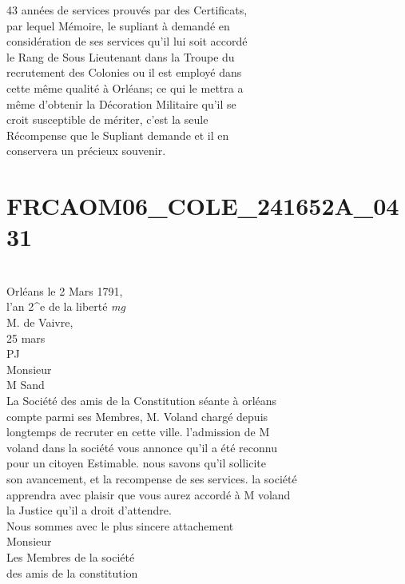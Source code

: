 \documentclass{article}
\begin{document}
\begin{pages}
43 années de services prouvés par des Certificats,\\
par lequel Mémoire, le supliant à demandé en\\
considération de ses services qu'il lui soit accordé\\
le Rang de Sous Lieutenant dans la Troupe du\\
recrutement des Colonies ou il est employé dans\\
cette même qualité à Orléans; ce qui le mettra a\\
même d'obtenir la Décoration Militaire qu'il se\\
croit susceptible de mériter, c'est la seule\\
Récompense que le Supliant demande et il en\\
conservera un précieux souvenir.
\pend
\endnumbering\beginnumbering\section{FRCAOM06\_COLE\_241652A\_0431}\pstart
\\
Orléans le 2 Mars 1791,\\
l'an 2\^{}e de la liberté
\pend
\vspace{0.5cm}\noindent
\textit{mg}
\footnotesize \\
M. de Vaivre,\\
25 mars\\
PJ
\normalsize \pstart
\\
Monsieur\\
M Sand\\
La Société des amis de la Constitution séante à orléans\\
compte parmi ses Membres, M. Voland chargé depuis\\
longtemps de recruter en cette ville. l'admission de M\\
voland dans la société vous annonce qu'il a été reconnu\\
pour un citoyen Estimable. nous savons qu'il sollicite\\
son avancement, et la recompense de ses services. la société\\
apprendra avec plaisir que vous aurez accordé à M voland\\
la Justice qu'il a droit d'attendre.\\
Nous sommes avec le plus sincere attachement\\
Monsieur\\
Les Membres de la société\\
des amis de la constitution\\

\end{pages}
\end{document}
